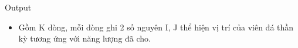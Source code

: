 Output  
\begin{itemize}
	\item     Gồm K dòng, mỗi dòng ghi 2 số nguyên I, J thể hiện vị trí của viên đá thần kỳ tương ứng với năng lượng đã cho.   
\end{itemize}